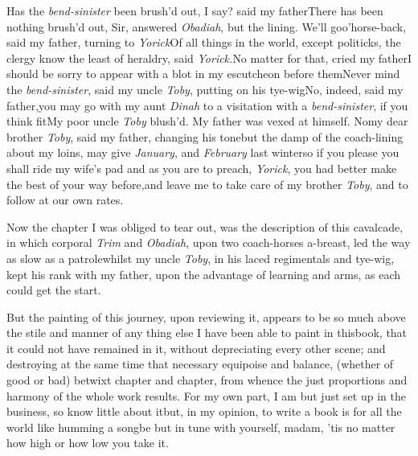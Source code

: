\documentclass{article}
\begin{document}
\tsk Has the \textit{bend-sinister} been brush’d out, I
say? said my father\tsk There has been nothing brush’d out, Sir, answered
\textit{Obadiah}, but the lining. We’ll go\break o’horse-back,
said my father, turning to \textit{Yorick}\tsk Of all things in the
world, except politicks, the clergy know the least of heraldry,
said \textit{Yorick.}\tsk No matter for that, cried my
father\tsk I should be sorry to appear with a blot in my
escutcheon before them\tsh Never mind the
\textit{bend-sinister}, said my uncle \textit{Toby}, putting
on his tye-wig\tsh No, indeed, said my father,\break \tsk you
may go with my aunt \textit{Dinah} to a visitation with a
\textit{bend-sinister}, if you think fit\tsk My poor uncle
\textit{Toby} blush’d. My father was vexed at himself.\tsk
No\tsk my dear brother \textit{Toby}, said my father,
changing his tone\tsk but the damp of the coach-lining about
my loins, may give  \textit{January}, and \textit{February} last
winter\tsk so if you please you shall ride my wife’s
pad\break\tsk
and as you are to preach, \textit{Yorick}, you had better
make the best of your way before,\tsk and leave me to take
care of my brother \textit{Toby}, and to follow at our\break
own rates.

Now the chapter I was obliged to tear\break
out, was the description of this cavalcade,\break
in which corporal \textit{Trim} and \textit{Obadiah},\break
upon two coach-horses a-breast, led the\break
way as slow as a patrole\tsk whilst my\break
uncle \textit{Toby}, in his laced regimentals and\break
tye-wig, kept his rank with my father,\break
{}\break
upon the advantage of learning and arms,\break
as each could get the start.


\tsk But the painting of this journey, upon reviewing it,
appears to be so much above the stile and manner of any thing else
I have been able to paint in this\break book, that it could not have
remained in it, without depreciating every other scene; and
destroying at the same time that necessary equipoise and
balance,\break
(whether of good or bad) betwixt chapter and chapter, from whence
the just proportions and harmony of the whole work results. For my
own part, I am but just set up in the business, so know little
about it\tsk but, in my opinion, to write a book is for all the
world like humming a song\tsk be but in tune with yourself,
madam, ’tis no matter how high or how low you take it.\tsk
\end{document}
